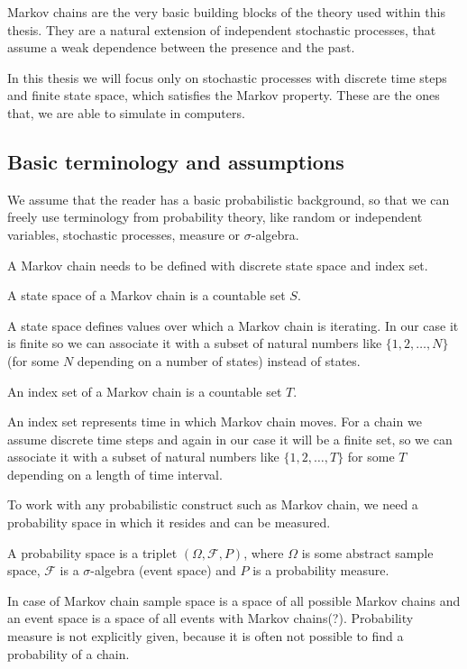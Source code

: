 Markov chains are the very basic building blocks of the theory used within this thesis. They are a natural extension of independent stochastic processes, that assume a weak dependence between the presence and the past.

In this thesis we will focus only on stochastic processes  with discrete time steps and finite state space, which satisfies the Markov property. These are the ones that, we are able to simulate in computers.

\subsection{Basic terminology and assumptions}
	We assume that the reader has a basic probabilistic background, so that we can freely use terminology from probability theory, like random or independent variables, stochastic processes, measure or $\sigma$-algebra.
	
	A Markov chain needs to be defined with discrete state space and index set.
	\begin{definition}
		A state space of a Markov chain is a countable set $S$.
	\end{definition}
	A state space defines values over which a Markov chain is iterating. In our case it is finite so we can associate it with a subset of natural numbers like $\{1, 2, \ldots, N\}$ (for some $N$ depending on a number of states) instead of states.
	
	\begin{definition}
		An index set of a Markov chain is a countable set $T$.
	\end{definition}
	An index set represents time in which Markov chain moves. For a chain we assume discrete time steps and again in our case it will be a finite set, so we can associate it with a subset of natural numbers like $\{1, 2, \ldots, T\}$ for some $T$ depending on a length of time interval.
	
	To work with any probabilistic construct such as Markov chain, we need a probability space in which it resides and can be measured.
	\begin{definition}
		A probability space is a triplet $\left( \Omega, \mathcal{F}, P \right)$, where $\Omega$ is some abstract sample space, $\mathcal{F}$ is a $\sigma$-algebra (event space) and $P$ is a probability measure.
	\end{definition}
	In case of Markov chain sample space is a space of all possible Markov chains and an event space is a space of all events with Markov chains(?). Probability measure is not explicitly given, because it is often not possible to find a probability of a chain.
	
